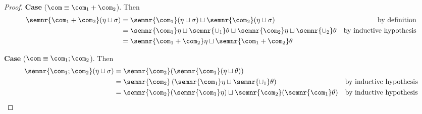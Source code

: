 \begin{proof}


  \medskip 

  \noindent
  \textbf{Case}  (\(\com \equiv \com_1 + \com_2\)).
  Then
  \begin{align*}
    \semnr{\com_1 + \com_2}(\eta \sqcup \sigma) & = \semnr{\com_1}(\eta \sqcup \sigma) \sqcup \semnr{\com_2}(\eta \sqcup \sigma) & \text{by definition}\\
                                                & = \semnr{\com_1}\eta \sqcup \semnr{\cup_1}\theta \sqcup \semnr{\com_2}\eta \sqcup \semnr{\cup_2}\theta & \text{by inductive hypothesis} \\
                                                & = \semnr{\com_1 + \com_2}\eta \sqcup \semnr{\com_1 + \com_2}\theta
  \end{align*}

  \medskip

  \noindent
  \textbf{Case}  (\(\com \equiv \com_1 ; \com_2\)).
  Then
  \begin{align*}
    \semnr{\com_1 ; \com_2}(\eta \sqcup \sigma) & = \semnr{\com_2}(\semnr{\com_1}(\eta \sqcup \theta)) \\
                                                & = \semnr{\com_2}\left(\semnr{\com_1}\eta \sqcup \semnr{\cup_1}\theta\right) & \text{by inductive hypothesis} \\
                                                & = \semnr{\com_2}(\semnr{\com_1}\eta) \sqcup \semnr{\com_2}(\semnr{\com_1}\theta) & \text{by inductive hypothesis}
  \end{align*}

  \medskip


\end{proof}
